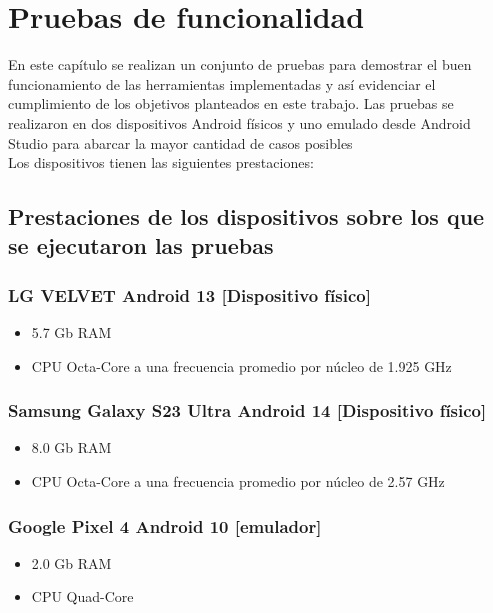 \chapter{Pruebas de funcionalidad}\label{chapter:implementation}
En este capítulo se realizan un conjunto de pruebas para demostrar el buen funcionamiento de las herramientas implementadas y así evidenciar el cumplimiento de los
objetivos planteados en este trabajo.
Las pruebas se realizaron en dos dispositivos Android físicos y uno emulado desde Android Studio para abarcar la mayor cantidad de casos posibles\\
Los dispositivos tienen las siguientes prestaciones:\\
\section{Prestaciones de los dispositivos sobre los que se ejecutaron las pruebas}
\subsection{LG VELVET Android 13 [Dispositivo físico]}
\begin{itemize}
    \item 5.7 Gb RAM
    \item CPU Octa-Core a una frecuencia promedio por núcleo de 1.925 GHz
\end{itemize}
\subsection{Samsung Galaxy S23 Ultra Android 14 [Dispositivo físico]}
\begin{itemize}
    \item 8.0 Gb RAM
    \item CPU Octa-Core a una frecuencia promedio por núcleo de 2.57 GHz
\end{itemize}

\subsection{Google Pixel 4 Android 10 [emulador]}
\begin{itemize}
    \item 2.0 Gb RAM
    \item CPU Quad-Core
\end{itemize}



